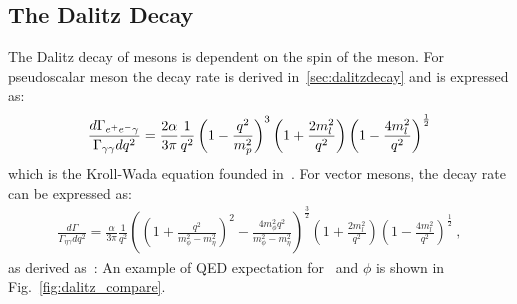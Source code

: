   \subsection{The Dalitz Decay}
  The Dalitz decay of mesons is dependent on the spin of the meson. For pseudoscalar meson the decay rate is derived in~\ref{sec:dalitzdecay} and is expressed as:
  \begin{align}\label{eq:eegff.finalkroll_II}
  \frac{d\Gamma_{e^+e^- \gamma}}{\Gamma_{\gamma\gamma} dq^2} = \frac{2 \alpha}{3 \pi} \frac{1}{q^2} \left( 1- \frac{q^2}{m_p^2}\right)^3 \left( 1+ \frac{2m_l^2}{q^2}\right) \left( 1- \frac{4m_l^2}{q^2}\right)^{\frac{1}{2}} 
  \end{align}
  which is the Kroll-Wada equation founded in~\cite{KrollWada,landsberg}. For vector mesons, the decay rate can be expressed as:
  \begin{align}
  \frac{d\Gamma}{\Gamma_{\eta\gamma} dq^2} = \frac{\alpha}{3 \pi} \frac{1}{q^2} \left( \left(1+ \frac{q^2}{m_{\phi}^2 - m_{\eta}^2} \right)^2 - \frac{4 m_{\phi}^2 q^2}{m_{\phi}^2 - m_{\eta}^2}\right)^\frac{3}{2} \left( 1+ \frac{2m_l^2}{q^2}\right) \left( 1- \frac{4m_l^2}{q^2}\right)^{\frac{1}{2}} \ ,
  \end{align}
  as derived as~\cite{landsberg}:
   An example of QED expectation for \etaTP  \ and $\phi$ is shown in Fig.~\ref{fig:dalitz_compare}.
